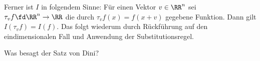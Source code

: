 \begin{antwort}

  Ferner ist $I$  in folgendem Sinne: 
  Für einen Vektor $v\in\RR^n$ sei $\tau_v f \fd \RR^n \to\RR$ die durch 
  $\tau_v f(x)=f(x+v)$ gegebene Funktion. Dann gilt
  $I(\tau_v f)=I(f)$. Das folgt wiederum durch Rückführung 
  auf den eindimensionalen Fall und Anwendung der 
  Substitutionsregel. \AntEnd
\end{antwort}

\begin{frage}
  Was besagt der Satz von Dini?
\end{frage}

